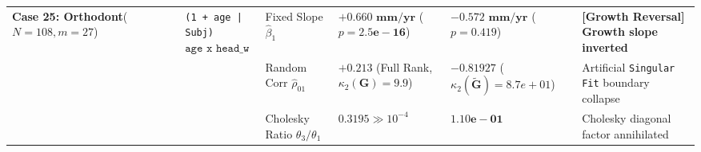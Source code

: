 \begin{table}[htbp]
\begin{tabular}{llllll}
\multirow{3}{*}{\textbf{Case 25: Orthodont}\newline \cite{Potthoff1964}\newline ($N=108, m=27$)}
 & \multirow{3}{*}{\texttt{(1 + age | Subj)}\newline $\texttt{age x head\_w}$}
 & Fixed Slope $\hat{\beta}_1$ & $\bm{+0.660\text{ mm/yr}}$ ($p = \bm{2.5e-16}$) & $\bm{-0.572\text{ mm/yr}}$ ($p = \bm{0.419}$) & \textbf{[Growth Reversal] Growth slope inverted} \\
 & & Random Corr $\hat{\rho}_{01}$ & $\bm{+0.213}$ (Full Rank, $\kappa_2(\mathbf{G})=9.9$) & $\bm{-0.81927}$ ($\kappa_2(\tilde{\mathbf{G}})=8.7e+01$) & Artificial \texttt{Singular Fit} boundary collapse \\
 & & Cholesky Ratio $\theta_3/\theta_1$ & $\bm{0.3195} \gg 10^{-4}$ & $\bm{1.10e-01}$ & Cholesky diagonal factor annihilated \\
\bottomrule
\end{tabular}
\end{table}
